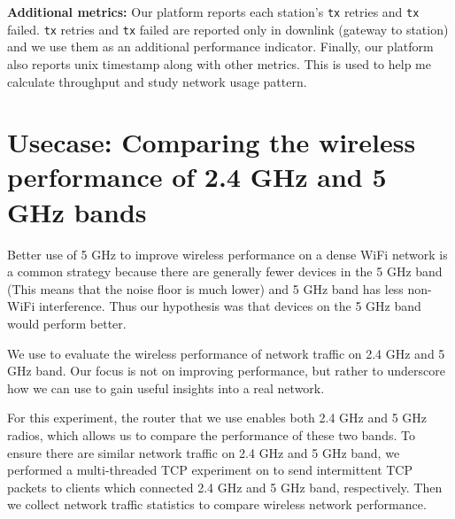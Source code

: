 \textbf{Additional metrics:} Our platform reports each station's \texttt{tx} retries and \texttt{tx} failed. \texttt{tx} retries and \texttt{tx} failed are reported only in downlink (gateway to station) and we use them as an additional performance indicator. Finally, our platform also reports unix timestamp along with other metrics. This is used to help me calculate throughput and study network usage pattern. 

\section{Usecase: Comparing the wireless performance of 2.4 GHz and 5 GHz bands}
\label{sec.usecase1}

Better use of 5 GHz to improve wireless performance on a dense WiFi network is a common strategy because there are generally fewer devices in the 5 GHz band (This means that the noise floor is much lower) and 5 GHz band has less non-WiFi interference. Thus our hypothesis was that devices on the 5 GHz band would perform better.

We use \sysname to evaluate the wireless performance of network traffic on 2.4 GHz and 5 GHz band. Our focus is not on improving performance, but rather to underscore how we can use \sysname to gain useful insights into a real network.

For this experiment, the router that we use enables both 2.4 GHz and 5 GHz radios, which allows us to compare the performance of these two bands. To ensure there are similar network traffic on 2.4 GHz and 5 GHz band, we performed a multi-threaded TCP experiment on \sysname to send intermittent TCP packets to clients which connected 2.4 GHz and 5 GHz band, respectively. Then we collect network traffic statistics to compare wireless network performance.

